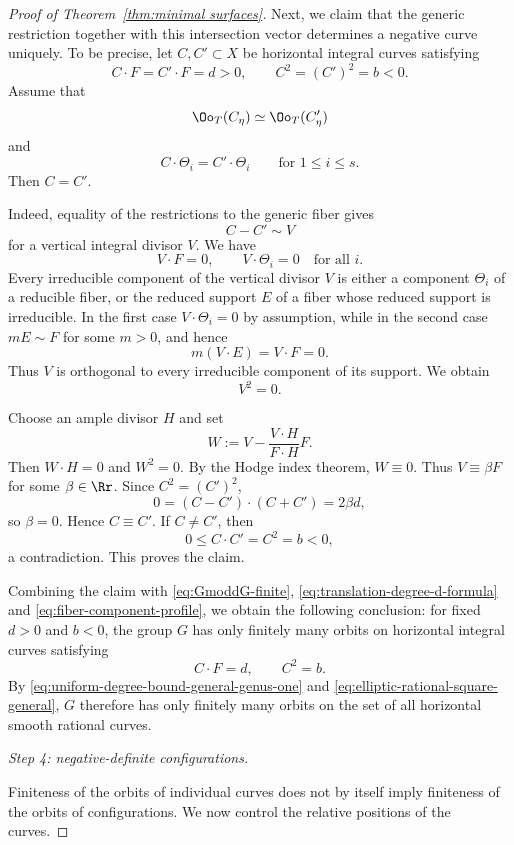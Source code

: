 \documentclass[12pt]{amsart}
\begin{document}
\begin{proof}[Proof of Theorem~\ref{thm:minimal surfaces}]
Next, we claim that the generic restriction together with this
intersection vector determines a negative curve uniquely.
To be precise, let $C,C'\subset X$ be horizontal integral curves satisfying
\[
    C\cdot F=C'\cdot F=d>0,
    \qquad
    C^2=(C')^2=b<0.
\]
Assume that
\[
    \Oo_T(C_\eta)\simeq\Oo_T(C'_\eta)
\]
and
\[
    C\cdot\Theta_i=C'\cdot\Theta_i
    \qquad\text{for }1\leq i\leq s.
\]
Then $C=C'$.


\noindent Indeed, equality of the restrictions to the generic fiber gives
\begin{equation}\label{eq:vertical-difference-general}
    C-C'\sim V
\end{equation}
for a vertical integral divisor $V$.  We have
\[
    V\cdot F=0,
    \qquad
    V\cdot\Theta_i=0\quad\text{for all }i.
\]
Every irreducible component of the vertical divisor \(V\) is either a component \(\Theta_i\) of a reducible fiber, or the reduced support \(E\) of a fiber whose reduced support is irreducible. In the first case \(V\cdot\Theta_i=0\) by assumption, while in the second case \(mE\sim F\) for some \(m>0\), and hence
\[
m(V\cdot E)=V\cdot F=0.
\]
Thus \(V\) is orthogonal to every irreducible component of its support. We obtain
\[
V^2=0.
\]

Choose an ample divisor $H$ and set
\[
    W:=V-\frac{V\cdot H}{F\cdot H}F.
\]
Then $W\cdot H=0$ and $W^2=0$.  By the Hodge index theorem, $W\equiv0$.
Thus $V\equiv\beta F$ for some $\beta\in\Rr$.  Since $C^2=(C')^2$,
\[
    0=(C-C')\cdot(C+C')=2\beta d,
\]
so $\beta=0$.  Hence $C\equiv C'$.  If $C\neq C'$, then
\[
    0\leq C\cdot C'=C^2=b<0,
\]
a contradiction.  This proves the claim.

Combining the claim with \eqref{eq:GmoddG-finite}, \eqref{eq:translation-degree-d-formula} and
\eqref{eq:fiber-component-profile}, we obtain the following conclusion:
for fixed $d>0$ and $b<0$, the group $G$ has only finitely many orbits on
horizontal integral curves satisfying
\[
    C\cdot F=d,\qquad C^2=b.
\]
By \eqref{eq:uniform-degree-bound-general-genus-one} and
\eqref{eq:elliptic-rational-square-general}, $G$ therefore has only finitely
many orbits on the set of all horizontal smooth rational curves.

\medskip
\noindent
\textit{Step 4: negative-definite configurations.}

Finiteness of the orbits of individual curves does not by itself imply
finiteness of the orbits of configurations.  We now control the relative
positions of the curves.


\end{proof}
\end{document}

